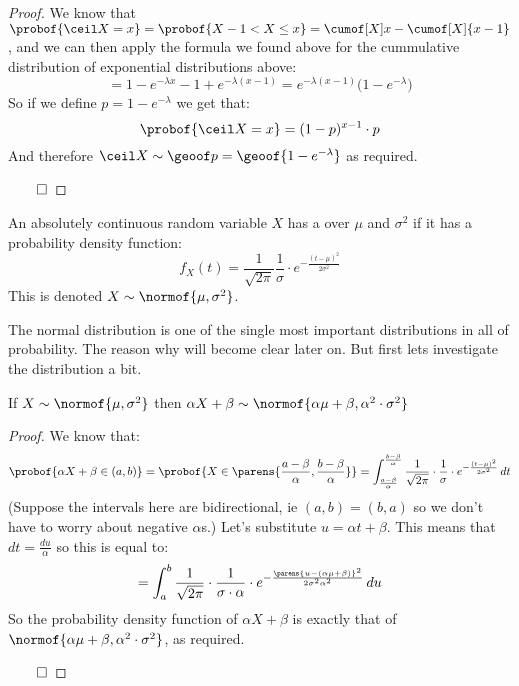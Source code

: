 \begin{proof}

	We know that $\probof{\ceil X=x} = \probof{X-1<X\leq x} = \cumof[X]x - \cumof[X]{x-1}$, and we can then apply the formula we found above for
	the cummulative distribution of exponential distributions above:
	\[ = 1-e^{-\lambda x} - 1 + e^{-\lambda(x-1)} = e^{-\lambda(x-1)}\big(1-e^{-\lambda}\big) \]
	So if we define $p=1-e^{-\lambda}$ we get that:
	\[ \probof{\ceil X=x} = (1-p)^{x-1}\cdot p \]
	And therefore $\ceil X\sim\geoof p=\geoof{1-e^{-\lambda}}$ as required.

	\hfill$\qed$

\end{proof}

\begin{defn*}

	An absolutely continuous random variable $X$ has a  over $\mu$ and $\sigma^2$ if it has a probability density function:
	\[ f_X(t) = \frac1{\sqrt{2\pi}}\frac1\sigma\cdot e^{-\frac{(t-\mu)^2}{2\sigma^2}} \]
	This is denoted $X\sim\normof{\mu,\sigma^2}$.

\end{defn*}

The normal distribution is one of the single most important distributions in all of probability.
The reason why will become clear later on.
But first lets investigate the distribution a bit.

\begin{prop*}

	If $X\sim\normof{\mu,\sigma^2}$ then $\alpha X+\beta\sim\normof{\alpha\mu+\beta, \alpha^2\cdot\sigma^2}$

\end{prop*}

\begin{proof}

	We know that:
	\[ \probof{\alpha X+\beta\in(a,b)} = \probof{X\in\parens{\frac{a-\beta}{\alpha},\frac{b-\beta}\alpha}} =
	\int_{\frac{a-\beta}\alpha}^{\frac{b-\beta}\alpha} \frac1{\sqrt{2\pi}}\cdot\frac1\sigma\cdot e^{-\frac{(t-\mu)^2}{2\sigma^2}}\,dt \]
	(Suppose the intervals here are bidirectional, ie $(a,b)=(b,a)$ so we don't have to worry about negative $\alpha$s.)
	Let's substitute $u=\alpha t+\beta$.
	This means that $dt=\frac{du}\alpha$ so this is equal to:
	\[ = \int_a^b \frac1{\sqrt{2\pi}}\cdot\frac1{\sigma\cdot\alpha}\cdot e^{-\frac{\parens{u-(\alpha\mu+\beta)}^2}{2\sigma^2\alpha^2}}\,du \]
	So the probability density function of $\alpha X+\beta$ is exactly that of $\normof{\alpha\mu+\beta,\alpha^2\cdot\sigma^2}$, as required.

	\hfill$\qed$

\end{proof}

